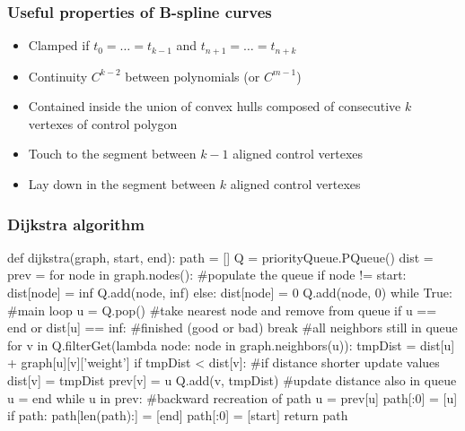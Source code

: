 \begin{frame}
  \frametitle{Useful properties of B-spline curves}
  \begin{itemize}
  \item \alert{Clamped} if $t_0=\dots =t_{k-1}$ and $t_{n+1}=\dots
    =t_{n+k}$\pause
  \item \alert{Continuity} $C^{k-2}$ between polynomials (or $C^{m-1}$)\pause
  \item Contained
    inside the union of \alert{convex hulls} composed of consecutive
    \alert{$k$} vertexes of control polygon
    \begin{center}
    \end{center}\pause
  \item Touch to the segment between \alert{$k-1$ aligned} control
    vertexes\pause
  \item Lay down in the segment between \alert{$k$ aligned} control vertexes
  \end{itemize}
\end{frame}

\begin{frame}[fragile]
  \frametitle{Dijkstra algorithm}
  \begin{pblock}
def dijkstra(graph, start, end):
  path = []
  Q = priorityQueue.PQueue()
  dist = {}
  prev = {}
  for node in graph.nodes(): #populate the queue
    if node != start:
      dist[node] = inf
      Q.add(node, inf)
    else:
      dist[node] = 0
      Q.add(node, 0)
  while True:  #main loop
    u = Q.pop() #take nearest node and remove from queue
    if u == end or dist[u] == inf: #finished (good or bad)
      break
    #all neighbors still in queue
    for v in Q.filterGet(lambda node: node in graph.neighbors(u)):
      tmpDist = dist[u] + graph[u][v]['weight']
      if tmpDist < dist[v]: #if distance shorter update values
        dist[v] = tmpDist
        prev[v] = u
        Q.add(v, tmpDist) #update distance also in queue
  u = end
  while u in prev:  #backward recreation of path
      u = prev[u]
      path[:0] = [u]
  if path:
      path[len(path):] = [end]
      path[:0] = [start]
  return path
  \end{pblock}  
\end{frame}

